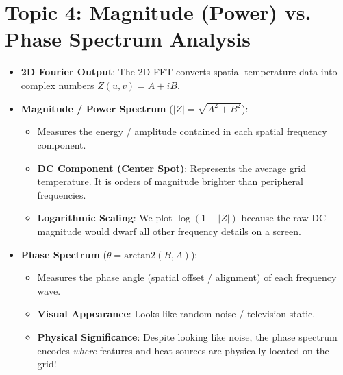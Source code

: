 \documentclass[11pt]{book}
\begin{document}
\section{Topic 4: Magnitude (Power) vs. Phase Spectrum Analysis}
\begin{itemize}
    \item \textbf{2D Fourier Output}: The 2D FFT converts spatial temperature data into complex numbers $Z(u,v) = A + iB$.
    \item \textbf{Magnitude / Power Spectrum} ($|Z| = \sqrt{A^2 + B^2}$):
    \begin{itemize}
        \item Measures the energy / amplitude contained in each spatial frequency component.
        \item \textbf{DC Component (Center Spot)}: Represents the average grid temperature. It is orders of magnitude brighter than peripheral frequencies.
        \item \textbf{Logarithmic Scaling}: We plot $\log(1 + |Z|)$ because the raw DC magnitude would dwarf all other frequency details on a screen.
    \end{itemize}
    \item \textbf{Phase Spectrum} ($\theta = \text{arctan2}(B, A)$):
    \begin{itemize}
        \item Measures the phase angle (spatial offset / alignment) of each frequency wave.
        \item \textbf{Visual Appearance}: Looks like random noise / television static.
        \item \textbf{Physical Significance}: Despite looking like noise, the phase spectrum encodes \textit{where} features and heat sources are physically located on the grid!
    \end{itemize}
\end{itemize}
\end{document}
